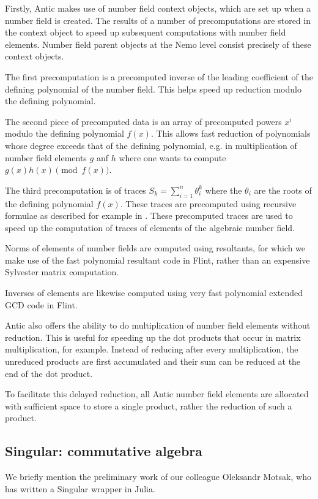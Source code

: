 \documentclass{sig-alternate-05-2015}
\begin{document}
Firstly, Antic makes use of number field context objects, which are set up when a number
field is created. The results of a number of precomputations are stored in the context
object to speed up subsequent computations with number field elements. Number field parent
objects at the Nemo level consist precisely of these context objects.

The first precomputation is a precomputed inverse of the leading coefficient of the defining
polynomial of the number field. This helps speed up reduction modulo the defining polynomial.

The second piece of precomputed data is an array of precomputed powers $x^i$ modulo the
defining polynomial $f(x)$. This allows fast reduction of polynomials whose degree exceeds
that of the defining polynomial, e.g. in multiplication of number field elements $g$ anf $h$
where one wants to compute $g(x)h(x) \pmod{f(x)}$.

The third precomputation is of traces $S_k = \sum_{i=1}^n \theta_i^k$ where the $\theta_i$
are the roots of the defining polynomial $f(x)$. These traces are precomputed using
recursive formulae as described for example in \cite{cohen}. These precomputed traces are
used to speed up the computation of traces of elements of the algebraic number field.

Norms of elements of number fields are computed using resultants, for which we make use of
the fast polynomial resultant code in Flint, rather than an expensive Sylvester matrix
computation.

Inverses of elements are likewise computed using very fast polynomial extended GCD code in
Flint.

Antic also offers the ability to do multiplication of number field elements without
reduction. This is useful for speeding up the dot products that occur in matrix
multiplication, for example. Instead of reducing after every multiplication, the unreduced
products are first accumulated and their sum can be reduced at the end of the dot product.

To facilitate this delayed reduction, all Antic number field elements are allocated with
sufficient space to store a single product, rather the reduction of such a product.

\subsection{Singular: commutative algebra}

We briefly mention the preliminary work of our colleague Oleksandr Motsak, who has written
a Singular wrapper in Julia.
\end{document}
